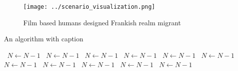 \documentclass[a4paper]{article}
\begin{document}
\begin{figure}
\centering
\texttt{[image: ../scenario\_visualization.png]}
\caption{Film based humans designed Frankish realm migrant
}
\end{figure}
 
\begin{algorithm}
\caption{An algorithm with caption}
\begin{algorithmic}
\    \State $N \gets N - 1$
\    \State $N \gets N - 1$
\    \State $N \gets N - 1$
\    \State $N \gets N - 1$
\    \State $N \gets N - 1$
\    \State $N \gets N - 1$
\    \State $N \gets N - 1$
\    \State $N \gets N - 1$
\    \State $N \gets N - 1$
\    \State $N \gets N - 1$
\    \State $N \gets N - 1$
\EndWhile
\end{algorithmic}
\end{algorithm}
\end{document}
